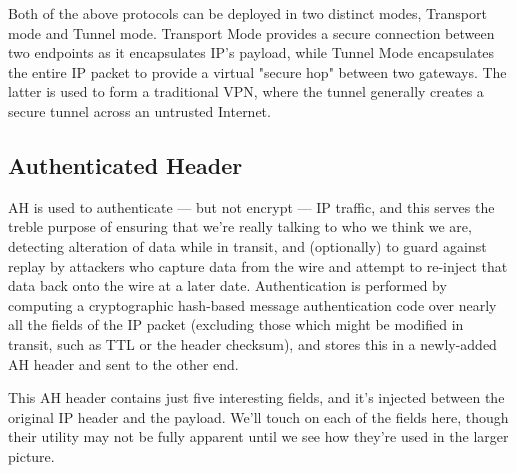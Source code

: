\documentclass[12pt]{article}
\begin{document}
Both of the above protocols can be deployed in two distinct modes, Transport mode and Tunnel mode. Transport Mode provides a secure connection between two endpoints as it encapsulates IP's payload, while Tunnel Mode encapsulates the entire IP packet to provide a virtual "secure hop" between two gateways. The latter is used to form a traditional VPN, where the tunnel generally creates a secure tunnel across an untrusted Internet.

\subsection*{Authenticated Header}

AH is used to authenticate — but not encrypt — IP traffic, and this serves the treble purpose of ensuring that we're really talking to who we think we are, detecting alteration of data while in transit, and (optionally) to guard against replay by attackers who capture data from the wire and attempt to re-inject that data back onto the wire at a later date.
Authentication is performed by computing a cryptographic hash-based message authentication code over nearly all the fields of the IP packet (excluding those which might be modified in transit, such as TTL or the header checksum), and stores this in a newly-added AH header and sent to the other end.
 
This AH header contains just five interesting fields, and it's injected between the original IP header and the payload. We'll touch on each of the fields here, though their utility may not be fully apparent until we see how they're used in the larger picture.
\end{document}
